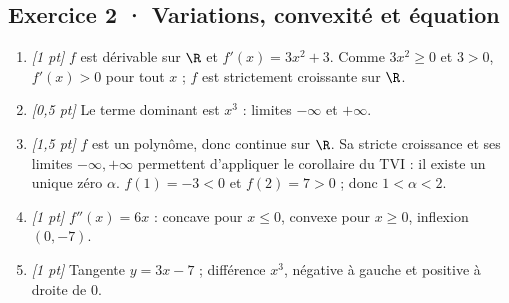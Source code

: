 \subsection*{Exercice 2 · Variations, convexité et équation}\begin{enumerate}

\item \textit{[1 pt]} $f$ est dérivable sur $\R$ et $f'(x)=3x^2+3$. Comme $3x^2\ge0$ et $3>0$, $f'(x)>0$ pour tout $x$ ; $f$ est strictement croissante sur $\R$.

\item \textit{[0,5 pt]} Le terme dominant est $x^3$ : limites $-\infty$ et $+\infty$.

\item \textit{[1,5 pt]} $f$ est un polynôme, donc continue sur $\R$. Sa stricte croissance et ses limites $-\infty,+\infty$ permettent d'appliquer le corollaire du TVI : il existe un unique zéro $\alpha$. $f(1)=-3<0$ et $f(2)=7>0$ ; donc $1<\alpha<2$.

\item \textit{[1 pt]} $f''(x)=6x$ : concave pour $x\le0$, convexe pour $x\ge0$, inflexion $(0,-7)$.

\item \textit{[1 pt]} Tangente $y=3x-7$ ; différence $x^3$, négative à gauche et positive à droite de $0$.

\end{enumerate}

